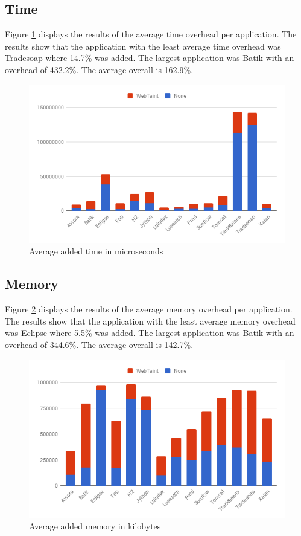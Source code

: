 \subsection{Time}
Figure \ref{fig:Time} displays the results of the average time overhead per application. The results show that the application with the least average time overhead was Tradesoap where 14.7\% was added. The largest application was Batik with an overhead of 432.2\%. The average overall is 162.9\%.

\begin{figure}[H]
    \centering
    \includegraphics[width=\textwidth]{images/Time.png}
    \caption{Average added time in microseconds}
    \label{fig:Time}
\end{figure}



\subsection{Memory}
Figure \ref{fig:Memory} displays the results of the average memory overhead per application. The results show that the application with the least average memory overhead was Eclipse where 5.5\% was added. The largest application was Batik with an overhead of 344.6\%. The average overall is 142.7\%.

\begin{figure}[H]
    \centering
    \includegraphics[width=\textwidth]{images/Memory.png}
    \caption{Average added memory in kilobytes}
    \label{fig:Memory}
\end{figure}
